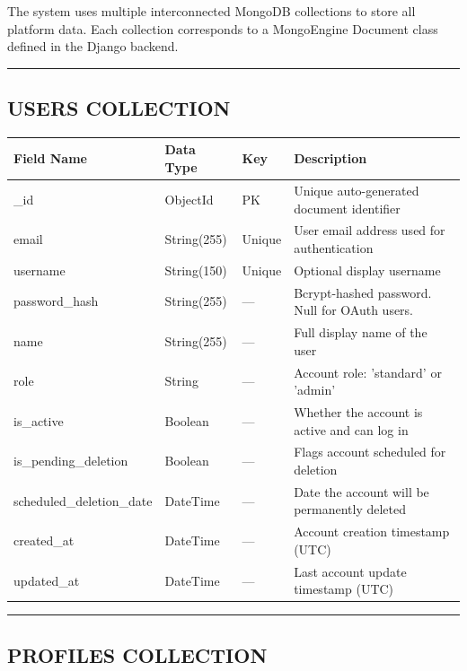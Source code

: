 \documentclass[12pt]{article}
\begin{document}
The system uses multiple interconnected MongoDB collections to store all platform data. Each collection corresponds to a MongoEngine Document class defined in the Django backend.

\noindent\rule{\textwidth}{0.4pt}

\subsection{USERS COLLECTION}


\begin{longtable}{|p{}|p{}|p{}|p{}|}
\hline
\textbf{Field Name} & \textbf{Data Type} & \textbf{Key} & \textbf{Description} \\ \hline
\endhead
\_id & ObjectId & PK & Unique auto-generated document identifier \\ \hline
email & String(255) & Unique & User email address used for authentication \\ \hline
username & String(150) & Unique & Optional display username \\ \hline
password\_hash & String(255) & — & Bcrypt-hashed password. Null for OAuth users. \\ \hline
name & String(255) & — & Full display name of the user \\ \hline
role & String & — & Account role: 'standard' or 'admin' \\ \hline
is\_active & Boolean & — & Whether the account is active and can log in \\ \hline
is\_pending\_deletion & Boolean & — & Flags account scheduled for deletion \\ \hline
scheduled\_deletion\_date & DateTime & — & Date the account will be permanently deleted \\ \hline
created\_at & DateTime & — & Account creation timestamp (UTC) \\ \hline
updated\_at & DateTime & — & Last account update timestamp (UTC) \\ \hline
\end{longtable}


\noindent\rule{\textwidth}{0.4pt}

\subsection{PROFILES COLLECTION}
\end{document}
